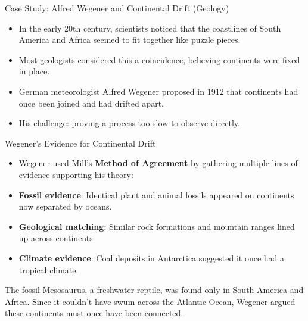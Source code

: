 \documentclass{beamer}
\begin{document}
\begin{frame}{Case Study: Alfred Wegener and Continental Drift (Geology)}
    \begin{itemize}
        \item In the early 20th century, scientists noticed that the coastlines of South America and Africa seemed to fit together like puzzle pieces.
        \item Most geologists considered this a coincidence, believing continents were fixed in place.
        \item German meteorologist Alfred Wegener proposed in 1912 that continents had once been joined and had drifted apart.
        \item His challenge: proving a process too slow to observe directly.
    \end{itemize}
    
    \begin{center}
    \end{center}
\end{frame}

\begin{frame}{Wegener's Evidence for Continental Drift}
    \begin{itemize}
        \item Wegener used Mill's \textbf{Method of Agreement} by gathering multiple lines of evidence supporting his theory:
        \item \textbf{Fossil evidence}: Identical plant and animal fossils appeared on continents now separated by oceans.
        \item \textbf{Geological matching}: Similar rock formations and mountain ranges lined up across continents.
        \item \textbf{Climate evidence}: Coal deposits in Antarctica suggested it once had a tropical climate.
    \end{itemize}
    
    \begin{example}
        The fossil Mesosaurus, a freshwater reptile, was found only in South America and Africa. Since it couldn't have swum across the Atlantic Ocean, Wegener argued these continents must once have been connected.
    \end{example}
\end{frame}
\end{document}

